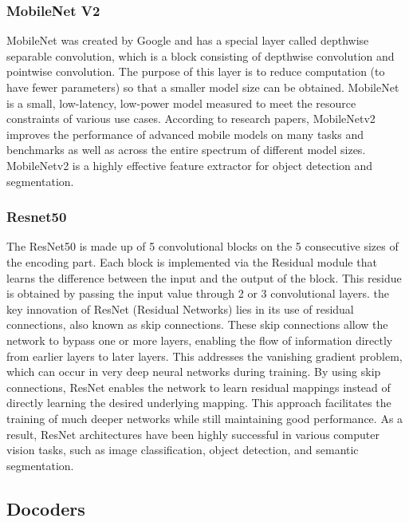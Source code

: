 \documentclass[12pt]{article}
\begin{document}
	\subsubsection{MobileNet V2}
		MobileNet  was  created  by  Google  and  has  a  special layer called depthwise  separable  convolution,  which  is a   block   consisting   of   depthwise   convolution   and pointwise  convolution.  The  purpose  of  this  layer  is  to reduce computation (to have  fewer parameters)  so that a  smaller  model  size  can  be  obtained.  MobileNet is  a  small,  low-latency,  low-power  model  measured  to meet  the  resource  constraints  of  various  use  cases. According  to  research  papers,  MobileNetv2  improves the  performance  of  advanced  mobile  models  on  many tasks  and  benchmarks  as  well  as  across  the  entire spectrum  of  different  model  sizes.  MobileNetv2  is  a highly  effective  feature  extractor  for  object  detection and segmentation.
	
	
	\subsubsection{Resnet50}
	
	The ResNet50 is made up of 5 convolutional blocks on the 5 consecutive sizes of the encoding part. Each block is implemented via the Residual module that learns the difference between the input and the output of the block. This residue is obtained by passing the input value through 2 or 3 convolutional layers. the key innovation of ResNet (Residual Networks) lies in its use of residual connections, also known as skip connections. These skip connections allow the network to bypass one or more layers, enabling the flow of information directly from earlier layers to later layers. This addresses the vanishing gradient problem, which can occur in very deep neural networks during training. By using skip connections, ResNet enables the network to learn residual mappings instead of directly learning the desired underlying mapping. This approach facilitates the training of much deeper networks while still maintaining good performance. As a result, ResNet architectures have been highly successful in various computer vision tasks, such as image classification, object detection, and semantic segmentation.


	
	\subsection{Docoders}	
	
\end{document}
